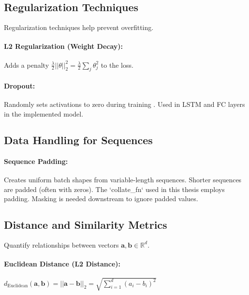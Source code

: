 \begin{appendices}
  \subsection{Regularization Techniques}
  Regularization techniques help prevent overfitting.

  \paragraph{L2 Regularization (Weight Decay):}
  Adds a penalty \( \frac{\lambda}{2} ||\theta||_2^2 = \frac{\lambda}{2} \sum_j \theta_j^2 \) to the loss.

  \paragraph{Dropout:}
  Randomly sets activations to zero during training \autocite{srivastava2014dropout}. Used in LSTM and FC layers in the implemented model.

  \subsection{Data Handling for Sequences}
  \paragraph{Sequence Padding:}
  Creates uniform batch shapes from variable-length sequences. Shorter sequences are padded (often with zeros). The `collate_fn` used in this thesis employs padding. Masking is needed downstream to ignore padded values.

  \subsection{Distance and Similarity Metrics}
  \label{subsec:distance_metrics} %
  Quantify relationships between vectors \( \bm{a}, \bm{b} \in \mathbb{R}^d \).

  \paragraph{Euclidean Distance (L2 Distance):}
  \( d_{\text{Euclidean}}(\bm{a}, \bm{b}) = ||\bm{a} - \bm{b}||_2 = \sqrt{\sum_{i=1}^d (a_i - b_i)^2} \)


\end{appendices}
